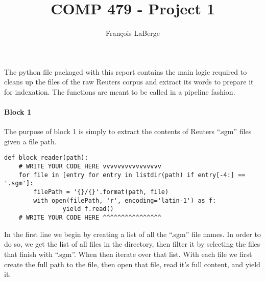 \documentclass[]{report}
\title{COMP 479 - Project 1}
\author{François LaBerge}
\begin{document}
\maketitle

The python file packaged with this report contains the main logic required to cleans up the files of the raw Reuters corpus and extract its words to prepare it for indexation. The functions are meant to be called in a pipeline fashion.

\paragraph{Block 1}
The purpose of block 1 is simply to extract the contents of Reuters ``.sgm'' files given a file path.
\begin{verbatim}
def block_reader(path):
	# WRITE YOUR CODE HERE vvvvvvvvvvvvvvvv
	for file in [entry for entry in listdir(path) if entry[-4:] == '.sgm']:
		filePath = '{}/{}'.format(path, file)
		with open(filePath, 'r', encoding='latin-1') as f:
				yield f.read()
	# WRITE YOUR CODE HERE ^^^^^^^^^^^^^^^^
\end{verbatim}
In the first line we begin by creating a list of all the ``.sgm'' file names. In order to do so, we get the list of all files in the directory, then filter it by selecting the files that finish with ``.sgm''. When then iterate over that list. With each file we first create the full path to the file, then open that file, read it's full content, and yield it.
\end{document}
